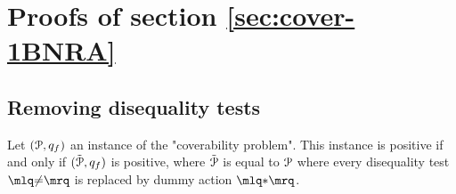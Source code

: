 \section{Proofs of section \ref{sec:cover-1BNRA}}
\label{app:cover-one-reg}
\subsection{Removing disequality tests}
\begin{corollary}
	\label{cor:removing_diseq_tests}
	Let $(\mathcal{P}, q_f)$ an instance of the "coverability problem". This instance is positive if and only if $(\tilde{\mathcal{P}}, q_f)$ is positive, where $\tilde{\mathcal{P}}$ is equal to $\mathcal{P}$ where every disequality test $\quotemarks{\diseqtestact}$ is replaced by dummy action $\quotemarks{\dummyact}$.  
\end{corollary}

